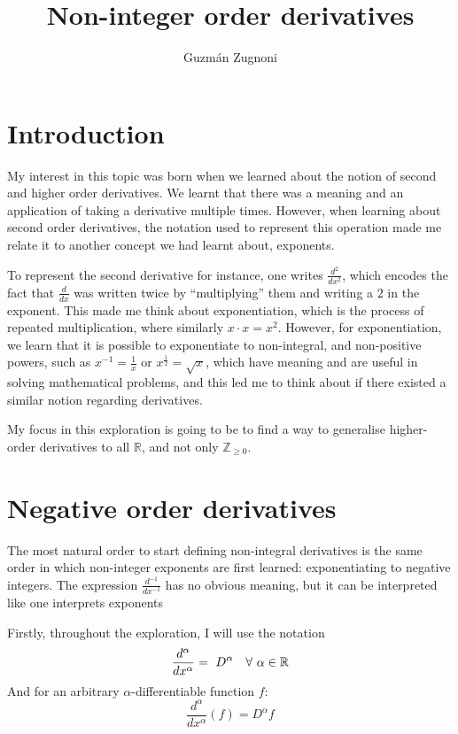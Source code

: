 \documentclass{article}
\author{Guzmán Zugnoni}
\title{Non-integer order derivatives}
\renewcommand{\maketitle}{
\begin{center}
	\Huge\textbf \thetitle
\end{center}
}
\def\squad{\hskip2\fontdimen3\font}
\begin{document}
\maketitle

\newpage

\tableofcontents

\newpage

\section{Introduction}

My interest in this topic was born when we learned about the notion of second
and higher order derivatives. We learnt that there was a meaning and an
application of taking a derivative multiple times. However, when learning about
second order derivatives, the notation used to represent this operation made
me relate it to another concept we had learnt about, exponents.

To represent the second derivative for instance, one writes $\frac{d^2}{dx^2}$,
which encodes the fact that $\frac{d}{dx}$ was written twice by ``multiplying''
them and writing a $2$ in the exponent. This made me think about
exponentiation, which is the process of repeated multiplication, where
similarly $x \cdot x = x^2$. However, for exponentiation, we learn that it is
possible to exponentiate to non-integral, and non-positive powers, such as
$x^{-1}=\frac{1}{x}$ or $x^\frac{1}{2} = \sqrt{x}$, which have meaning and are
useful in solving mathematical problems, and this led me to think about if
there existed a similar notion regarding derivatives.

My focus in this exploration is going to be to find a way to generalise
higher-order derivatives to all $\mathbb{R}$, and not only $\mathbb{Z}_{\geq0}$.

\section{Negative order derivatives} \label{neg_order_ders}

The most natural order to start defining non-integral derivatives is the same
order in which non-integer exponents are first learned: exponentiating to
negative integers. The expression $\frac{d^{-1}}{dx^{-1}}$ has no obvious
meaning, but it can be interpreted like one interprets exponents

Firstly, throughout the exploration, I will use the notation
$$  \frac{d^\alpha}{dx^\alpha}=\
	D^\alpha \quad \forall \squad \alpha \in \mathbb{R}$$
And for an arbitrary $\alpha$-differentiable function $f$:
$$\frac{d^\alpha}{dx^\alpha}\left(f\right) = D^\alpha f$$
\end{document}
